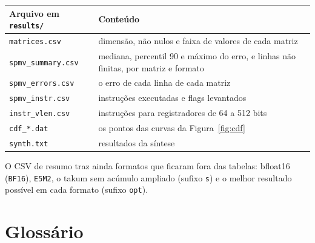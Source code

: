 \documentclass[11pt,a4paper]{article}
\newcommand{\code}[1]{\texttt{#1}}
\begin{document}
\begin{center}
\begin{tabularx}{\linewidth}{lX}
\toprule
Arquivo em \code{results/} & Conteúdo \\
\midrule
\code{matrices.csv} & dimensão, não nulos e faixa de valores de cada matriz \\
\code{spmv\_summary.csv} & mediana, percentil 90 e máximo do erro, e linhas não finitas, por matriz e
  formato \\
\code{spmv\_errors.csv} & o erro de cada linha de cada matriz \\
\code{spmv\_instr.csv} & instruções executadas e flags levantados \\
\code{instr\_vlen.csv} & instruções para registradores de 64 a 512 bits \\
\code{cdf\_*.dat} & os pontos das curvas da Figura~\ref{fig:cdf} \\
\code{synth.txt} & resultados da síntese \\
\bottomrule
\end{tabularx}
\end{center}

O CSV de resumo traz ainda formatos que ficaram fora das tabelas: bfloat16 (\code{BF16}), \code{E5M2}, o
takum sem acúmulo ampliado (sufixo \code{s}) e o melhor resultado possível em cada formato (sufixo
\code{opt}).

\section{Glossário}
\end{document}
